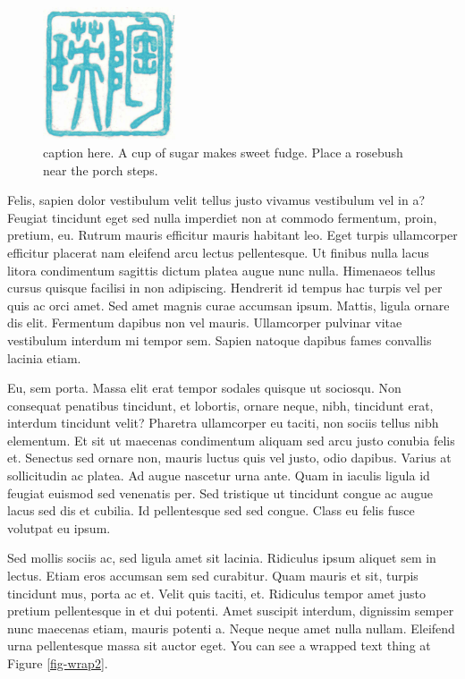 \documentclass[
  9pt,
  letterpaper,
  DIV=11,
  numbers=noendperiod]{scrartcl}
\begin{document}

\begin{figure}
  \centering
  \includegraphics[width=0.35\textwidth]{stamp1b.jpg}
  \caption{\label{fig-wrap}caption here. A cup of sugar makes sweet fudge. Place a rosebush near the porch steps.}
  \vspace{-3pt}
\end{figure}

Felis, sapien dolor vestibulum velit tellus justo vivamus vestibulum vel
in a? Feugiat tincidunt eget sed nulla imperdiet non at commodo
fermentum, proin, pretium, eu. Rutrum mauris efficitur mauris habitant
leo. Eget turpis ullamcorper efficitur placerat nam eleifend arcu lectus
pellentesque. Ut finibus nulla lacus litora condimentum sagittis dictum
platea augue nunc nulla. Himenaeos tellus cursus quisque facilisi in non
adipiscing. Hendrerit id tempus hac turpis vel per quis ac orci amet.
Sed amet magnis curae accumsan ipsum. Mattis, ligula ornare dis elit.
Fermentum dapibus non vel mauris. Ullamcorper pulvinar vitae vestibulum
interdum mi tempor sem. Sapien natoque dapibus fames convallis lacinia
etiam.

Eu, sem porta. Massa elit erat tempor sodales quisque ut sociosqu. Non
consequat penatibus tincidunt, et lobortis, ornare neque, nibh,
tincidunt erat, interdum tincidunt velit? Pharetra ullamcorper eu
taciti, non sociis tellus nibh elementum. Et sit ut maecenas condimentum
aliquam sed arcu justo conubia felis et. Senectus sed ornare non, mauris
luctus quis vel justo, odio dapibus. Varius at sollicitudin ac platea.
Ad augue nascetur urna ante. Quam in iaculis ligula id feugiat euismod
sed venenatis per. Sed tristique ut tincidunt congue ac augue lacus sed
dis et cubilia. Id pellentesque sed sed congue. Class eu felis fusce
volutpat eu ipsum.

Sed mollis sociis ac, sed ligula amet sit lacinia. Ridiculus ipsum
aliquet sem in lectus. Etiam eros accumsan sem sed curabitur. Quam
mauris et sit, turpis tincidunt mus, porta ac et. Velit quis taciti, et.
Ridiculus tempor amet justo pretium pellentesque in et dui potenti. Amet
suscipit interdum, dignissim semper nunc maecenas etiam, mauris potenti
a. Neque neque amet nulla nullam. Eleifend urna pellentesque massa sit
auctor eget. You can see a wrapped text thing at Figure \ref{fig-wrap2}.
\end{document}
